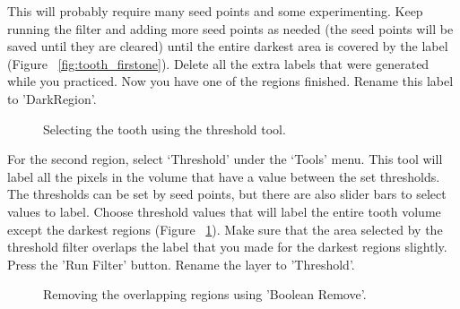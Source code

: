 \documentclass[fleqn,12pt,openany]{book}
\begin{document}
 This will probably require many seed points and some experimenting.  Keep 
 running the filter and adding more seed points as needed (the seed points will 
 be saved until they are cleared) until the entire darkest area is covered by 
 the label (Figure ~\ref{fig:tooth_firstone}).  Delete all the extra labels 
 that were generated while you practiced.  Now you have one of the regions finished.  Rename
 this label to 'DarkRegion'.

\begin{figure}
\caption{\label{fig:tooth_threshold} Selecting the tooth using the threshold tool.}
\end{figure} 

For the second region, select `Threshold' under the `Tools' menu.  
This tool will label all the pixels in the volume that have a value between the 
set thresholds.  The thresholds can be set by seed points, but there are also 
slider bars to select values to label.  Choose threshold values that will label 
the entire tooth volume except the darkest regions 
(Figure ~\ref{fig:tooth_threshold}).  Make sure that the area selected by the 
threshold filter overlaps the label that you made for the darkest regions
slightly.  Press the 'Run Filter' button.  Rename the layer to 'Threshold'.

\begin{figure}
\caption{\label{fig:tooth_remove_during} Removing the overlapping regions using 'Boolean Remove'.}
\end{figure} 
\end{document}
